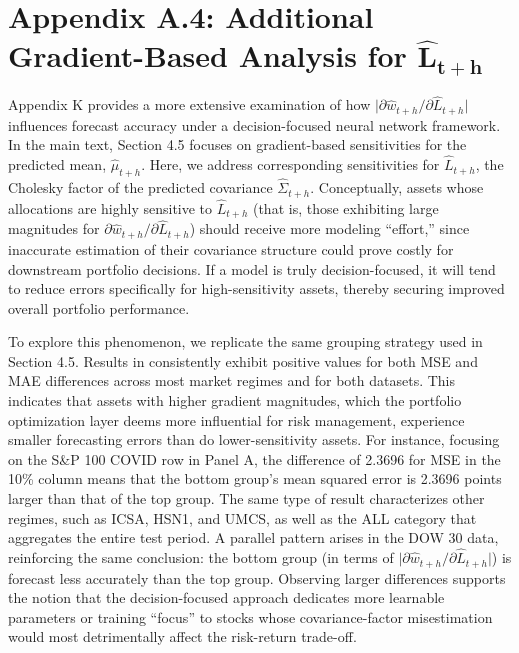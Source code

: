 \section*{Appendix A.4: Additional Gradient-Based Analysis for $\boldsymbol{\hat{L}_{t+h}}$} \label{Appendix:A5}

Appendix K provides a more extensive examination of how $\bigl|\partial \hat{w}_{t+h} / \partial \hat{L}_{t+h}\bigr|$ influences forecast accuracy under a decision-focused neural network framework. In the main text, Section 4.5 focuses on gradient-based sensitivities for the predicted mean, $\hat{\mu}_{t+h}$. Here, we address corresponding sensitivities for $\hat{L}_{t+h}$, the Cholesky factor of the predicted covariance $\hat{\Sigma}_{t+h}$. Conceptually, assets whose allocations are highly sensitive to $\hat{L}_{t+h}$ (that is, those exhibiting large magnitudes for $\partial \hat{w}_{t+h} / \partial \hat{L}_{t+h}$) should receive more modeling “effort,” since inaccurate estimation of their covariance structure could prove costly for downstream portfolio decisions. If a model is truly decision-focused, it will tend to reduce errors specifically for high-sensitivity assets, thereby securing improved overall portfolio performance.

To explore this phenomenon, we replicate the same grouping strategy used in Section 4.5. Results in  consistently exhibit positive values for both MSE and MAE differences across most market regimes and for both datasets. This indicates that assets with higher gradient magnitudes, which the portfolio optimization layer deems more influential for risk management, experience smaller forecasting errors than do lower-sensitivity assets. For instance, focusing on the S\&P 100 COVID row in Panel A, the difference of 2.3696 for MSE in the 10\% column means that the bottom group’s mean squared error is 2.3696 points larger than that of the top group. The same type of result characterizes other regimes, such as ICSA, HSN1, and UMCS, as well as the ALL category that aggregates the entire test period. A parallel pattern arises in the DOW 30 data, reinforcing the same conclusion: the bottom group (in terms of $\bigl|\partial \hat{w}_{t+h} / \partial \hat{L}_{t+h}\bigr|$) is forecast less accurately than the top group. Observing larger differences supports the notion that the decision-focused approach dedicates more learnable parameters or training “focus” to stocks whose covariance-factor misestimation would most detrimentally affect the risk-return trade-off.


